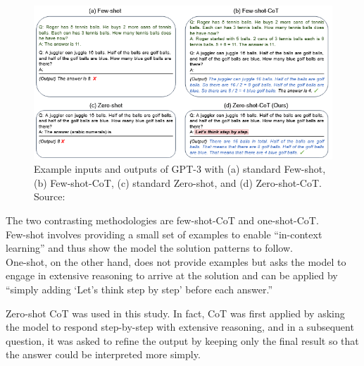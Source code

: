 \documentclass[12pt]{article}
\begin{document}
    \begin{figure}[H]
    \centering
            \includegraphics[width=1\textwidth]{CoTTheory.png}
    \caption[Few-shot and one-shot CoT]{Example inputs and outputs of GPT-3 with (a) standard Few-shot, (b) Few-shot-CoT, (c) standard Zero-shot, and (d) Zero-shot-CoT. Source: \cite{kojima2023largelanguagemodelszeroshot}}
    \end{figure} 
    
    The two contrasting methodologies are few-shot-CoT and one-shot-CoT.\\
Few-shot involves providing a small set of examples to enable “in-context learning” and thus show the model the solution patterns to follow.\\
One-shot, on the other hand, does not provide examples but asks the model to engage in extensive reasoning to arrive at the solution and can be applied by “simply adding ‘Let's think step by step’ before each answer.”\cite{kojima2023largelanguagemodelszeroshot}

Zero-shot CoT was used in this study. In fact, CoT was first applied by asking the model to respond step-by-step with extensive reasoning, and in a subsequent question, it was asked to refine the output by keeping only the final result so that the answer could be interpreted more simply.\\
\end{document}
